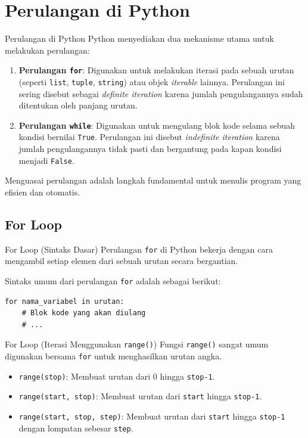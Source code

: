 \documentclass[aspectratio=169, table]{beamer}
\begin{document}
\section{Perulangan di Python}
\begin{frame}{Perulangan di Python}
Python menyediakan dua mekanisme utama untuk melakukan perulangan:
\begin{enumerate}
    \item \textbf{Perulangan \texttt{for}}: Digunakan untuk melakukan iterasi pada sebuah urutan (seperti \texttt{list}, \texttt{tuple}, \texttt{string}) atau objek \textit{iterable} lainnya. Perulangan ini sering disebut sebagai \textit{definite iteration} karena jumlah pengulangannya sudah ditentukan oleh panjang urutan.
    \item \textbf{Perulangan \texttt{while}}: Digunakan untuk mengulang blok kode selama sebuah kondisi bernilai \texttt{True}. Perulangan ini disebut \textit{indefinite iteration} karena jumlah pengulangannya tidak pasti dan bergantung pada kapan kondisi menjadi \texttt{False}.
\end{enumerate}

Menguasai perulangan adalah langkah fundamental untuk menulis program yang efisien dan otomatis.
\end{frame}

\subsection{For Loop}
\begin{frame}[fragile]{For Loop (Sintaks Dasar)}
Perulangan \texttt{for} di Python bekerja dengan cara mengambil setiap elemen dari sebuah urutan secara bergantian.

Sintaks umum dari perulangan \texttt{for} adalah sebagai berikut:
\begin{lstlisting}[style=PythonStyle, caption={Sintaks Dasar Perulangan for}]
for nama_variabel in urutan:
    # Blok kode yang akan diulang
    # ...
\end{lstlisting}
\end{frame}

\begin{frame}[fragile]{For Loop (Iterasi Menggunakan \texttt{range()})}
Fungsi \texttt{range()} sangat umum digunakan bersama \texttt{for} untuk menghasilkan urutan angka.
\begin{itemize}
    \item \texttt{range(stop)}: Membuat urutan dari 0 hingga \texttt{stop-1}.
    \item \texttt{range(start, stop)}: Membuat urutan dari \texttt{start} hingga \texttt{stop-1}.
    \item \texttt{range(start, stop, step)}: Membuat urutan dari \texttt{start} hingga \texttt{stop-1} dengan lompatan sebesar \texttt{step}.
\end{itemize}
\end{frame}
\end{document}
